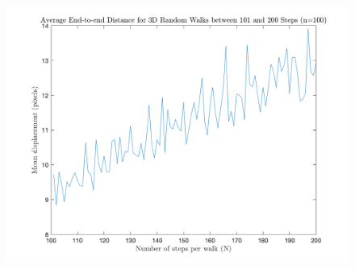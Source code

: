 \begin{enumerate}
\begin{figure}[ht!]
        \includegraphics[height=0.46\textheight]{4D.png}
    \end{figure}
\end{enumerate}
